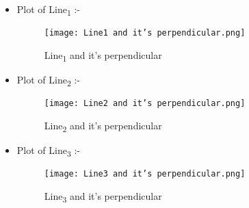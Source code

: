 \documentclass[journal,12pt,twocolumn]{IEEEtran}
\begin{document}
\begin{itemize}
\item Plot of Line\textsubscript{1} :-
\begin{figure}[H]
\centering
\texttt{[image: Line1 and it's perpendicular.png]}
\caption{Line\textsubscript{1} and it's perpendicular}
\label{fig:circle}	
\end{figure}
\item Plot of Line\textsubscript{2} :-
\begin{figure}[H]
\centering
\texttt{[image: Line2 and it's perpendicular.png]}
\caption{Line\textsubscript{2} and it's perpendicular}
\label{fig:circle}	
\end{figure}
 \item Plot of Line\textsubscript{3} :-
\begin{figure}[H]
\centering
\texttt{[image: Line3 and it's perpendicular.png]}
\caption{Line\textsubscript{3} and it's perpendicular}
\label{fig:circle}	
\end{figure}

\end{itemize}
\end{document}
